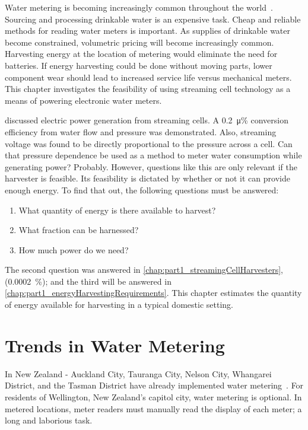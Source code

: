 
Water metering is becoming increasingly common throughout the world~\cite{Chang2012}.
Sourcing and processing drinkable water is an expensive task.
Cheap and reliable methods for reading water meters is important.
As supplies of drinkable water become constrained, volumetric pricing will become increasingly common.
Harvesting energy at the location of metering would eliminate the need for batteries.
If energy harvesting could be done without moving parts, lower component wear should lead to increased service life versus mechanical meters.
This chapter investigates the feasibility of using streaming cell technology as a means of powering electronic water meters.

 discussed electric power generation from streaming cells.
A \SI{0.2}{\micro\percent} conversion efficiency from water flow and pressure was demonstrated.
Also, streaming voltage was found to be directly proportional to the pressure across a cell.
Can that pressure dependence be used as a method to meter water consumption while generating power? Probably.
However, questions like this are only relevant if the harvester is feasible.
Its feasibility is dictated by whether or not it can provide enough energy.
To find that out, the following questions must be answered:
\begin{enumerate}
  \item What quantity of energy is there available to harvest?
  \item What fraction can be harnessed?
  \item How much power do we need?
\end{enumerate}
The second question was answered in \cref{chap:part1_streamingCellHarvesters}, (\SI{0.0002}{\percent}); and the third will be answered in \cref{chap:part1_energyHarvestingRequirements}.
This chapter estimates the quantity of energy available for harvesting in a typical domestic setting.



\section{Trends in Water Metering}

  In New Zealand - Auckland City, Tauranga City, Nelson City, Whangarei District, and the Tasman District have already implemented water metering~\cite{WaterNewZealand2011}.
  For residents of Wellington, New Zealand's capitol city, water metering is optional.
  In metered locations, meter readers must manually read the display of each meter; a long and laborious task.

